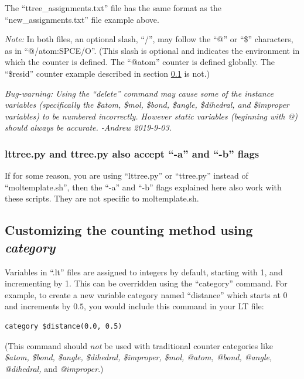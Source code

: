 \documentclass[11pt]{article}
\begin{document}
The ``ttree\_assignments.txt'' file has the same format 
as the ``new\_assignments.txt'' file example above.

\textit{Note:} In both files, an optional slash, ``/'', 
      may follow the ``@'' or ``\$'' characters, 
      as in ``@/atom:SPCE/O''. 
(This slash is optional and indicates
the environment in which the counter is defined.
The ``@atom'' counter is defined globally.
The ``\$resid'' counter example described 
in section \ref{sec:custom_categories} is not.)

\textit{Bug-warning: Using the ``delete'' command 
may cause some of the instance variables
(specifically the \$atom, \$mol, \$bond, \$angle, \$dihedral, 
and \$improper variables)
to be numbered incorrectly.  
However static variables (beginning with @) should always be accurate.
-Andrew 2019-9-03.}


\subsubsection*{lttree.py and ttree.py also accept ``-a'' and ``-b'' flags}
If for some reason, you are using ``lttree.py'' or ``ttree.py'' 
instead of ``moltemplate.sh'', then the ``-a'' and ``-b'' flags explained 
here also work with these scripts.  They are not specific to moltemplate.sh.




\subsection{Customizing the counting method using \textit{category}}
\label{sec:custom_categories}
Variables in ``.lt'' files are assigned to integers by default,
starting with 1, and incrementing by 1.
This can be overridden using the ``category'' command.
For example, to create a new variable category named ``distance''
which starts at $0$ and increments by $0.5$, 
you would include this command in your LT file:
\begin{verbatim}
category $distance(0.0, 0.5)
\end{verbatim}
(This command should \textit{not} be used with traditional counter categories
 like 
\textit{\$atom, \$bond, \$angle, \$dihedral, \$improper, \$mol, 
@atom, @bond, @angle, @dihedral,} and \textit{@improper}.)
\end{document}
